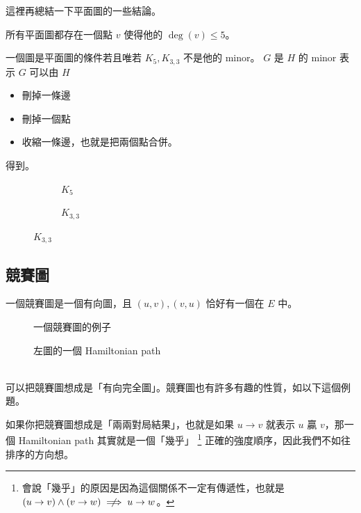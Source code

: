 \documentclass[a4paper,12pt]{book}
\begin{document}
這裡再總結一下平面圖的一些結論。

\begin{theorem}[定理]
  所有平面圖都存在一個點 $v$ 使得他的 $\deg(v) \leq 5$。
\end{theorem}

\begin{theorem}[定理]
  一個圖是平面圖的條件若且唯若 $K_5, K_{3, 3}$ 不是他的 minor。
  $G$ 是 $H$ 的 minor 表示 $G$ 可以由 $H$
  \begin{itemize}
    \item 刪掉一條邊
    \item 刪掉一個點
    \item 收縮一條邊，也就是把兩個點合併。
  \end{itemize}
  得到。
\begin{figure}[H]
  \centering
  \begin{subfigure}[b]{0.49\textwidth}
    \centering
    
    \caption{$K_5$}
  \end{subfigure}
  \begin{subfigure}[b]{0.49\textwidth}
    \centering
    
    \caption{$K_{3, 3}$}
  \end{subfigure}
\end{figure}
\end{theorem}


\subsection{競賽圖}
一個競賽圖是一個有向圖，且 $(u, v), (v, u)$ 恰好有一個在 $E$ 中。

\begin{minipage}{0.49\textwidth}
\begin{figure}[H]
  \centering
  
  \caption{一個競賽圖的例子}
\end{figure}
\end{minipage}
\begin{minipage}{0.49\textwidth}
\begin{figure}[H]
  \centering
  
  \caption{左圖的一個 Hamiltonian path}
\end{figure}
\end{minipage} \\

可以把競賽圖想成是「有向完全圖」。競賽圖也有許多有趣的性質，如以下這個例題。

如果你把競賽圖想成是「兩兩對局結果」，也就是如果 $u \to v$
就表示 $u$ 贏 $v$，那一個 Hamiltonian path 其實就是一個「幾乎」
\footnote{會說「幾乎」的原因是因為這個關係不一定有傳遞性，也就是
$(u \to v) \land (v \to w) \centernot\implies u \to w$。}
正確的強度順序，因此我們不如往排序的方向想。
\end{document}
